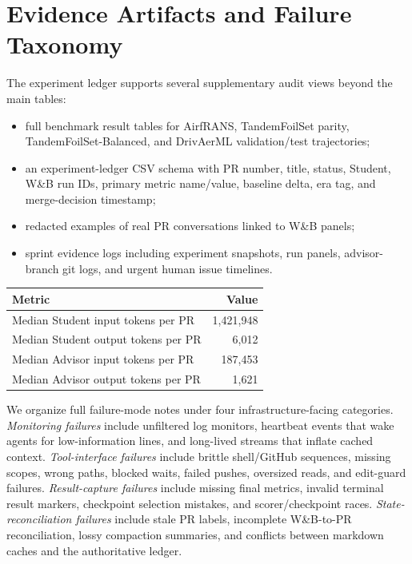 \documentclass{article}
\begin{document}
\section{Evidence Artifacts and Failure Taxonomy}
\label{app:evidence-taxonomy}

The experiment ledger supports several supplementary audit views beyond the main tables:

\begin{itemize}[leftmargin=*,topsep=2pt,itemsep=2pt,parsep=0pt]
  \item full benchmark result tables for AirfRANS, TandemFoilSet parity, TandemFoilSet-Balanced, and DrivAerML validation/test trajectories;
  \item an experiment-ledger CSV schema with PR number, title, status, Student, W\&B run IDs, primary metric name/value, baseline delta, era tag, and merge-decision timestamp;
  \item redacted examples of real PR conversations linked to W\&B panels;
  \item sprint evidence logs including experiment snapshots, run panels, advisor-branch git logs, and urgent human issue timelines.
\end{itemize}

\begin{center}
  \label{tab:app-pr-token-load}
  \small
  \begin{tabular}{@{}lr@{}}
    \toprule
    Metric & Value \\
    \midrule
    Median Student input tokens per PR & 1,421,948 \\
    Median Student output tokens per PR & 6,012 \\
    Median Advisor input tokens per PR & 187,453 \\
    Median Advisor output tokens per PR & 1,621 \\
    \bottomrule
  \end{tabular}
\end{center}

We organize full failure-mode notes under four infrastructure-facing categories. \textit{Monitoring failures} include unfiltered log monitors, heartbeat events that wake agents for low-information lines, and long-lived streams that inflate cached context. \textit{Tool-interface failures} include brittle shell/GitHub sequences, missing scopes, wrong paths, blocked waits, failed pushes, oversized reads, and edit-guard failures. \textit{Result-capture failures} include missing final metrics, invalid terminal result markers, checkpoint selection mistakes, and scorer/checkpoint races. \textit{State-reconciliation failures} include stale PR labels, incomplete W\&B-to-PR reconciliation, lossy compaction summaries, and conflicts between markdown caches and the authoritative ledger.
\end{document}
